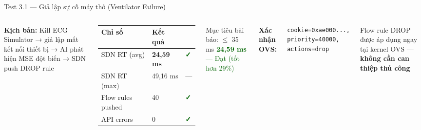 \documentclass[aspectratio=169, 12pt]{beamer}
\newcommand{\cmark}{\textcolor{darkgreen}{\textbf{✓}}}
\begin{document}
\begin{frame}[fragile]{Test 3.1 — Giả lập sự cố máy thở (Ventilator Failure)}

\begin{columns}[T]
\textbf{Kịch bản:} Kill ECG Simulator → giả lập mất kết nối thiết bị → AI phát hiện MSE đột biến → SDN push DROP rule

\vspace{0.3cm}
\begin{table}
\renewcommand{\arraystretch}{1.3}
\begin{tabular}{lll}
\toprule
\textbf{Chỉ số} & \textbf{Kết quả} & \\
\midrule
SDN RT (avg) & \textbf{24,59 ms} & \cmark \\
SDN RT (max) & 49,16 ms & — \\
Flow rules pushed & 40 & \cmark \\
API errors & 0 & \cmark \\
\bottomrule
\end{tabular}
\end{table}

\begin{exampleblock}{Mục tiêu bài báo: $\leq$ 35 ms}
\textcolor{darkgreen}{\textbf{24,59 ms} — Đạt (tốt hơn 29\%)}
\end{exampleblock}

\vspace{0.3cm}
\textbf{Xác nhận OVS:}
\begin{footnotesize}
\begin{verbatim}
cookie=0xae000...,
priority=40000,
actions=drop
\end{verbatim}
\end{footnotesize}

\vspace{0.2cm}
Flow rule DROP được áp dụng ngay tại kernel OVS — \textbf{không cần can thiệp thủ công}
\end{columns}

\end{frame}
\end{document}

